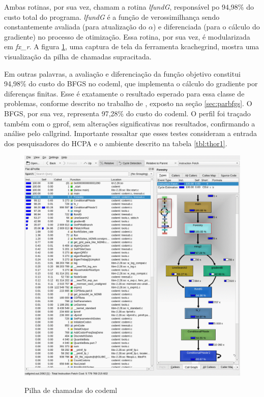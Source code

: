 \documentclass[cic,tc]{iiufrgs}
\begin{document}
Ambas rotinas, por sua vez, chamam a rotina \textit{lfundG}, responsável po
94,98\% do custo total do programa. \textit{lfundG} é a função de
verossimilhança sendo constantemente avaliada (para atualização do $\alpha$) e
diferenciada (para o cálculo do gradiente) no processo de otimização. Essa
rotina, por sua vez, é modularizada em \textit{fx\_r}. A figura
\ref{fig:kcachegrind}, uma captura de tela da ferramenta kcachegrind, mostra
uma visualização da pilha de chamadas supracitada.

Em outras palavras, a avaliação e diferenciação da função objetivo constitui
94,98\% do custo do BFGS no codeml, que implementa o cálculo do gradiente por
diferenças finitas. Esse é exatamente o resultado esperado para essa classe de
problemas, conforme descrito no trabalho de \cite{byrd1988parallel}, exposto na
seção \ref{sec:parbfgs}. O BFGS, por sua vez, representa 97,28\% do custo do
codeml. O perfil foi traçado também com o gprof, sem alterações
significativas nos resultados, confirmando a análise pelo callgrind. Importante
ressaltar que esses testes consideram a entrada dos pesquisadores do HCPA e o
ambiente descrito na tabela \ref{tbl:thor1}.

\begin{figure} \caption{Pilha de chamadas do codeml} \begin{center}
\includegraphics[width=0.9\linewidth]{img/kcachegrind.png} \end{center}
 \label{fig:kcachegrind} \end{figure}
\end{document}
